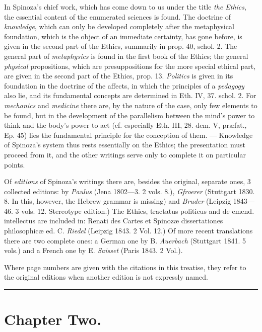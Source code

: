 \documentclass[12pt,a4paper,openany]{book}
\newcommand{\opage}[1]{\marginnote{\footnotesize\textit{[#1]}}}
\begin{document}
In Spinoza's chief work, which has come down to us under the title
\emph{the Ethics}, the essential content of the enumerated sciences is
found. The doctrine of \emph{knowledge}, which can only
\opage{43}be developed completely after the metaphysical foundation, which
is the object of an immediate certainty, has gone before, is given in
the second part of the Ethics, summarily in prop. 40, schol. 2. The
general part of \emph{metaphysics} is found in the first book of the
Ethics; the general \emph{physical} propositions, which are
presuppositions for the more special ethical part, are given in the
second part of the Ethics, prop. 13. \emph{Politics} is given in its
foundation in the doctrine of the affects, in which the principles of a
\emph{pedagogy} also lie, and its fundamental concepts are determined in
Eth. IV, 37. schol. 2. For \emph{mechanics} and \emph{medicine} there
are, by the nature of the case, only few elements to be found, but in
the development of the parallelism between the mind's power to think and
the body's power to act (cf. especially Eth. III, 28. dem. V, præfat.,
Ep. 45) lies the fundamental principle for the conception of them. ---
Knowledge of Spinoza's system thus rests essentially on the Ethics; the
presentation must proceed from it, and the other writings serve only to
complete it on particular points.

Of \emph{editions} of Spinoza's writings there are, besides the
original, separate ones, 3 collected editions: by \emph{Paulus} (Jena
1802---3. 2 vols. 8.), \emph{Gfroerer} (Stuttgart 1830. 8. In this,
however, the Hebrew grammar is missing) and \emph{Bruder} (Leipzig
1843---46. 3 vols. 12. Stereotype edition.) The Ethics, tractatus
politicus and de emend. intellectus are included in: Renati des Cartes
et Spinozæ dissertationes philosophicæ ed. C. \emph{Riedel} (Leipzig
1843. 2 Vol. 12.) Of more recent translations there are two complete
ones: a German one by B. \emph{Auerbach} (Stuttgart 1841. 5 vols.) and a
French one by E. \emph{Saisset} (Paris 1843. 2 Vol.).

Where page numbers are given with the citations in this treatise, they
refer to the original editions when another edition is not expressly
named.

\bigskip
\begin{center}\rule{2.5cm}{0.4pt}\end{center}

\newpage

\chapter*{Chapter Two.}
\end{document}
